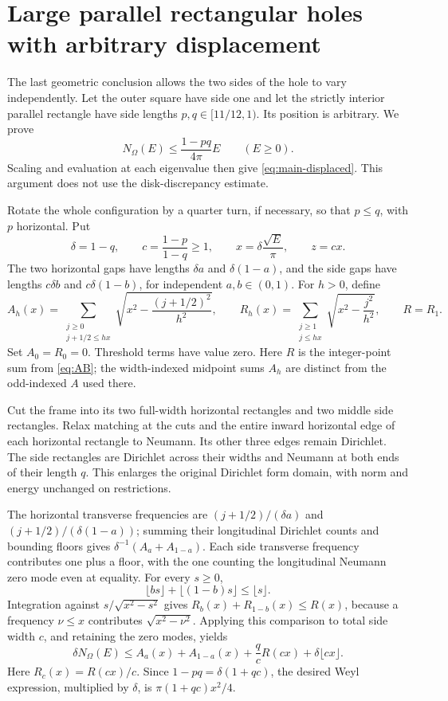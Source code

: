 \documentclass[11pt,reqno]{amsart}
\numberwithin{equation}{section}
\newcommand{\Om}{\Omega}
\begin{document}
\section{Large parallel rectangular holes with arbitrary displacement}\label{sec:displaced}

The last geometric conclusion allows the two sides of the hole to vary
independently. Let the outer square have side one and let the strictly
interior parallel rectangle have side lengths $p,q\in[11/12,1)$.
Its position is arbitrary. We prove
\[
 N_\Om(E)\le\frac{1-pq}{4\pi}E\qquad(E\ge0).
\]
Scaling and evaluation at each eigenvalue then give
\eqref{eq:main-displaced}. This argument does not use the
disk-discrepancy estimate.

Rotate the whole configuration by a quarter turn, if necessary, so
that $p\le q$, with $p$ horizontal. Put
\[
 \delta=1-q,\qquad c=\frac{1-p}{1-q}\ge1,
 \qquad x=\delta\frac{\sqrt E}{\pi},\qquad z=cx.
\]
The two horizontal gaps have lengths $\delta a$ and
$\delta(1-a)$, and the side gaps have lengths $c\delta b$ and
$c\delta(1-b)$, for independent $a,b\in(0,1)$. For $h>0$, define
\begin{equation}\label{eq:rect-width-sums}
 A_h(x)=\sum_{\substack{j\ge0\\j+1/2\le hx}}
       \sqrt{x^2-\frac{(j+1/2)^2}{h^2}},\qquad
 R_h(x)=\sum_{\substack{j\ge1\\j\le hx}}
       \sqrt{x^2-\frac{j^2}{h^2}},\qquad R=R_1.
\end{equation}
Set $A_0=R_0=0$. Threshold terms have value zero. Here $R$
is the integer-point sum from \eqref{eq:AB}; the width-indexed
midpoint sums $A_h$ are distinct from the odd-indexed $A$
used there.

Cut the frame into its two full-width horizontal rectangles and
two middle side rectangles. Relax matching at the cuts and the
entire inward horizontal edge of each horizontal rectangle to
Neumann. Its other three edges remain Dirichlet. The side
rectangles are Dirichlet across their widths and Neumann at both
ends of their length $q$. This enlarges the original Dirichlet
form domain, with norm and energy unchanged on restrictions.

The horizontal transverse frequencies are
$(j+1/2)/(\delta a)$ and $(j+1/2)/(\delta(1-a))$; summing
their longitudinal Dirichlet counts and bounding floors gives
$\delta^{-1}(A_a+A_{1-a})$. Each side transverse frequency
contributes one plus a floor, with the one counting the
longitudinal Neumann zero mode even at equality.
For every $s\ge0$,
\[
 \lfloor bs\rfloor+\lfloor(1-b)s\rfloor\le\lfloor s\rfloor.
\]
Integration against $s/\sqrt{x^2-s^2}$ gives
$R_b(x)+R_{1-b}(x)\le R(x)$, because a frequency $\nu\le x$
contributes $\sqrt{x^2-\nu^2}$. Applying this comparison to
total side width $c$, and retaining the zero modes, yields
\begin{equation}\label{eq:rect-mixed}
 \delta N_\Om(E)\le
 A_a(x)+A_{1-a}(x)+\frac q cR(cx)+\delta\lfloor cx\rfloor.
\end{equation}
Here $R_c(x)=R(cx)/c$. Since $1-pq=\delta(1+qc)$, the
desired Weyl expression, multiplied by $\delta$, is
$\pi(1+qc)x^2/4$.
\end{document}
